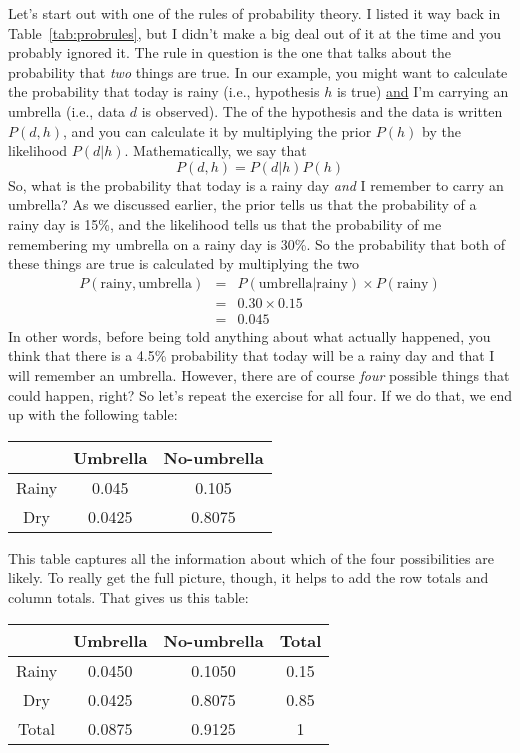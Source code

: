 Let's start out with one of the rules of probability theory. I listed it way back in Table~\ref{tab:probrules}, but I didn't make a big deal out of it at the time and you probably ignored it. The rule in question is the one that talks about the probability that {\it two} things are true. In our example, you might want to calculate the probability that today is rainy (i.e., hypothesis $h$ is true) \underline{and} I'm carrying an umbrella (i.e., data $d$ is observed). The  of the hypothesis and the data is written $P(d,h)$, and you can calculate it by multiplying the prior $P(h)$ by the likelihood $P(d|h)$. Mathematically, we say that
$$
P(d,h) = P(d|h) P(h)
$$
So, what is the probability that today is a rainy day {\it and} I remember to carry an umbrella? As we discussed earlier, the prior tells us that the probability of a rainy day is 15\%, and the likelihood tells us that the probability of me remembering my umbrella on a rainy day is 30\%. So the probability that both of these things are true is calculated by multiplying the two
\begin{eqnarray*}
P(\mbox{rainy}, \mbox{umbrella}) & = & P(\mbox{umbrella} | \mbox{rainy}) \times P(\mbox{rainy}) \\
& = & 0.30 \times 0.15 \\
& = & 0.045
\end{eqnarray*}
In other words, before being told anything about what actually happened, you think that there is a 4.5\% probability that today will be a rainy day and that I will remember an umbrella. However, there are of course {\it four} possible things that could happen, right? So let's repeat the exercise for all four. If we do that, we end up with the following table:
\begin{center}
\begin{tabular}{c|cc}
& Umbrella & No-umbrella \\ \hline
Rainy & 0.045 & 0.105 \\
Dry & 0.0425 & 0.8075
\end{tabular}
\end{center}
This table captures all the information about which of the four possibilities are likely. To really get the full picture, though, it helps to add the row totals and column totals. That gives us this table:
\begin{center}
\begin{tabular}{c|cc|c}
& Umbrella & No-umbrella & Total \\ \hline
Rainy & 0.0450 & 0.1050 & 0.15 \\
Dry & 0.0425 & 0.8075  & 0.85 \\ \hline
Total & 0.0875 & 0.9125 & 1
\end{tabular}
\end{center}
